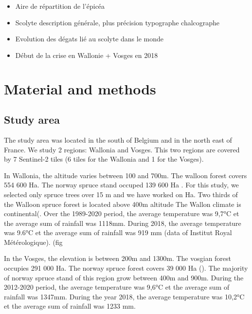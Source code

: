 \documentclass[3p,times]{elsarticle}
\begin{document}
\begin{itemize}
	\item Aire de répartition de l'épicéa
	\item Scolyte description générale, plus précision typographe chalcographe
	\item Evolution des dégats lié au scolyte dans le monde
	\item Début de la crise en Wallonie + Vosges en 2018
\end{itemize}

\section{Material and methods}
\subsection{Study area}
The study area was located in the south of Belgium and in the north east of France. We study 2 regions: Wallonia and Vosges.
This two regions are covered by 7 Sentinel-2 tiles (6 tiles for the Wallonia and 1 for the Vosges).

In Wallonia, the altitude varies between 100 and 700m. The walloon forest covers 554 600 Ha. The norway spruce stand occuped 139 600 Ha \citep{Alderweireld_2015}. For this study, we selected only spruce trees over 15 m and we have worked on %
Ha. Two thirds of the Walloon spruce forest is located above 400m altitude
The Wallon climate is continental(\citep{Metzger_2005}. %
Over the 1989-2020 period, the average temperature was 9,7°C et the average sum of rainfall was 1118mm. During 2018, the average temperature was 9.6°C et the average sum of rainfall was 919 mm (data of Institut Royal Métérologique). (fig %

In the Vosges, the elevation is between 200m and 1300m. The vosgian forest occupies 291 000 Ha. The norway spruce forest covers 39 000 Ha (\citep{francais_donnees_2022}).
The majority of norway spruce stand of this region grow between 400m and 900m.
During the 2012-2020 period, the average temperature was 9,6°C et the average sum of rainfall was 1347mm. During the year 2018, the average temperature was 10,2°C et the average sum of rainfall was 1233 mm.
\end{document}
